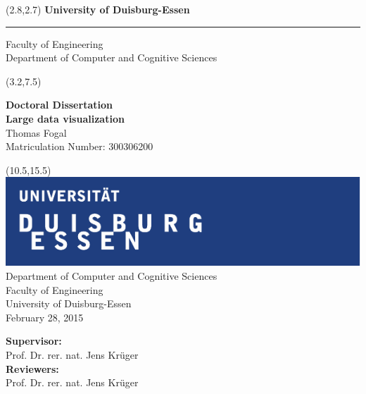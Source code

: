 \begin{titlepage}
\vspace*{-1cm}
\newlength{\links}
\setlength{\links}{0.9cm}
\setlength{\TPHorizModule}{1cm}
\setlength{\TPVertModule}{1cm}

\sf
\LARGE

\begin{textblock}{16.5}(2.8,2.7)
 \hspace*{-0.8cm} \textbf{University of Duisburg-Essen} \\
 \hspace*{-1.15cm} \rule{5mm}{5mm} \hspace*{0.0cm} Faculty of Engineering\\
 \large{}Department of Computer and Cognitive Sciences\\
\end{textblock}

\begin{textblock}{14.5}(3.2,7.5)
\begin{center}
  \large
{\bf Doctoral Dissertation} \\[1cm]
{ \LARGE  \bf Large data visualization} \\[1.3cm]
Thomas Fogal\\
Matriculation Number: 300306200
\end{center}
\end{textblock}

\begin{textblock}{10}(10.5,15.5)
\includegraphics[width=.94\textwidth]{images/unilogo}\\
\normalsize
\raggedleft
Department of Computer and Cognitive Sciences \\
Faculty of Engineering \\
University of Duisburg-Essen \\[2ex]

February 28, 2015\\[13ex]
\raggedright
{\bf Supervisor:} \\
Prof. Dr. rer. nat. Jens Kr\"uger\\

{\bf Reviewers:}\\
Prof. Dr. rer. nat. Jens Kr\"uger\\
\end{textblock}

\end{titlepage}


